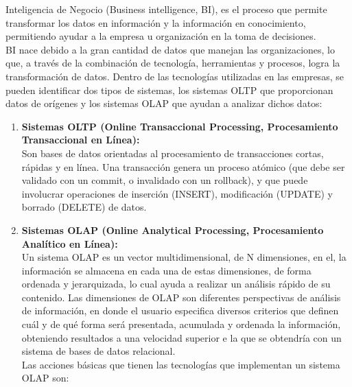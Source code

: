 Inteligencia de Negocio (Business intelligence, BI), es el proceso que permite transformar los datos en información y la información en conocimiento, permitiendo ayudar a la empresa u organización en la toma de decisiones.\cite{bi}\\

BI nace debido a la gran cantidad de datos que manejan las organizaciones, lo que, a través de la combinación de tecnología, herramientas y procesos, logra la transformación de datos. Dentro de las tecnologías utilizadas en las empresas, se pueden identificar dos tipos de sistemas, los sistemas OLTP que proporcionan datos de orígenes y los sistemas OLAP que ayudan a analizar dichos datos: \cite{olapvsoltp}\\


\begin{enumerate}

    \item \textbf{Sistemas OLTP (Online Transaccional Processing, Procesamiento Transaccional en Línea):}\\
Son bases de datos orientadas al procesamiento de transacciones cortas, rápidas y en línea. Una transacción genera un proceso atómico (que debe ser validado con un commit, o invalidado con un rollback), y que puede involucrar operaciones de inserción (INSERT), modificación (UPDATE) y borrado (DELETE) de datos.\\

\item \textbf{Sistemas OLAP (Online Analytical Processing, Procesamiento Analítico en Línea):}\\
Un sistema OLAP es un vector multidimensional, de N dimensiones, en el, la información se almacena en cada una de estas dimensiones, de forma ordenada y jerarquizada, lo cual ayuda a realizar un análisis rápido de su contenido. Las dimensiones de OLAP son diferentes perspectivas de análisis de información, en donde el usuario especifica diversos criterios que definen cuál y de qué forma será presentada, acumulada y ordenada la información, obteniendo resultados a una velocidad superior e la que se obtendría con un sistema de bases de datos relacional.\\

Las acciones básicas que tienen las tecnologías que implementan un sistema OLAP son: \cite{bi}


\end{enumerate}
